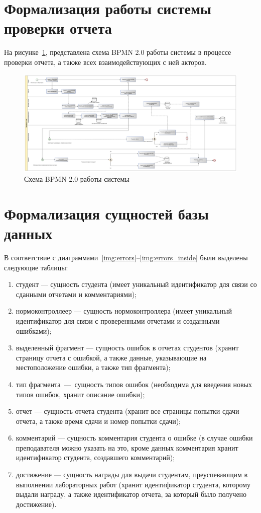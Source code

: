 \section{Формализация работы системы проверки отчета}
На рисунке~\ref{img:main_sys_bpmn}, представлена схема BPMN 2.0 работы системы в процессе проверки отчета, а также всех взаимодействующих с ней акторов.
\begin{figure}
	\centering
	\includegraphics[width=\textwidth]{./inc/img/process_check_bpmn.pdf}
	\caption{Схема BPMN 2.0 работы системы}
	\label{img:main_sys_bpmn}
\end{figure}


\section{Формализация сущностей базы данных}

В соответствие с диаграммами~\ref{img:errors}--\ref{img:errors_inside} были выделены следующие таблицы:
\begin{enumerate}
	\item студент --- сущность студента (имеет уникальный идентификатор для связи со сданными отчетами и комментариями);
	\item нормоконтроллеер --- сущность нормоконтроллера (имеет уникальный идентификатор для связи с проверенными отчетами и созданными ошибками);
	\item выделенный фрагмент --- сущность ошибок в отчетах студентов (хранит страницу отчета с ошибкой, а также данные, указывающие на местоположение ошибки, а также тип фрагмента);
	\item тип фрагмента~---~сущность типов ошибок (необходима для введения новых типов ошибок, хранит описание ошибки);
	\item отчет --- сущность отчета студента (хранит все страницы попытки сдачи отчета, а также время сдачи и номер попытки сдачи);
	\item комментарий --- сущность комментария студента о ошибке (в случае ошибки преподавателя можно указать на это, кроме данных комментария хранит идентификатор студента, создавшего комментарий);
	\item достижение --- сущность награды для выдачи студентам, преуспевающим в выполнении лабораторных работ (хранит идентификатор студента, которому выдали награду, а также идентификатор отчета, за который было получено достижение).
\end{enumerate}

